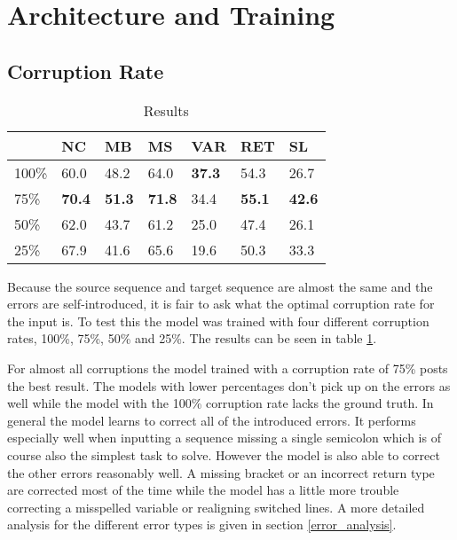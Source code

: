 \section{Architecture and Training}

\subsection{Corruption Rate}

\begin{table}[t]
\begin{tabular}{ | m{2cm} | m{1cm} | m{1cm} | m{1cm} | m{1cm} | m{1cm} | m{1cm} | }
  \hline
  & NC & MB & MS & VAR & RET & SL \\
  \hline
  \hline
  100\% & 60.0 & 48.2 & 64.0 & \textbf{37.3} & 54.3 & 26.7 \\
  \hline
  75\% & \textbf{70.4} & \textbf{51.3} & \textbf{71.8} & 34.4 & \textbf{55.1} & \textbf{42.6} \\
  \hline
  50\% & 62.0 & 43.7 & 61.2 & 25.0 & 47.4 & 26.1 \\
  \hline
  25\% & 67.9 & 41.6 & 65.6 & 19.6 & 50.3 & 33.3 \\
  \hline
\end{tabular}
\caption{Results}
\label{corruption_rate_table}
\end{table}

Because the source sequence and target sequence are almost the same and the errors are self-introduced, it is fair to ask what the optimal corruption rate for the input is. To test this the model was trained with four different corruption rates, 100\%, 75\%, 50\% and 25\%. The results can be seen in table \ref{corruption_rate_table}.

For almost all corruptions the model trained with a corruption rate of 75\% posts the best result. The models with lower percentages don't pick up on the errors as well while the model with the 100\% corruption rate lacks the ground truth. In general the model learns to correct all of the introduced errors. It performs especially well when inputting a sequence missing a single semicolon which is of course also the simplest task to solve. However the model is also able to correct the other errors reasonably well. A missing bracket or an incorrect return type are corrected most of the time while the model has a little more trouble correcting a misspelled variable or realigning switched lines. A more detailed analysis for the different error types is given in section \ref{error_analysis}.

